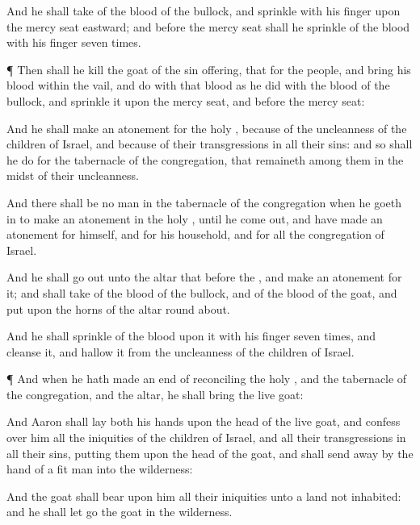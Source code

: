{And he shall
take of the
blood of the
bullock, and
sprinkle
{} with his
finger upon the mercy
seat
eastward; and
before the mercy
seat shall he
sprinkle of the
blood with his
finger
seven
times.


\par }{\PP {}¶ Then shall he
kill the
goat of the sin
offering, that
{} for the
people, and
bring his
blood
within the
vail, and
do with that
blood as he
did with the
blood of the
bullock, and
sprinkle it upon the mercy
seat, and
before the mercy
seat:

And he shall make an
atonement for the
holy
{}, because of the
uncleanness of the
children of
Israel, and because of their
transgressions in all their
sins: and so shall he
do for the
tabernacle of the
congregation, that
remaineth among them in the
midst of their
uncleanness.

And there shall be no
man in the
tabernacle of the
congregation when he
goeth in to make an
atonement in the
holy
{}, until he come
out, and have made an
atonement for himself, and for his
household, and for all the
congregation of
Israel.

And he shall go
out unto the
altar that
{}
before the
{}, and make an
atonement for it; and shall
take of the
blood of the
bullock, and of the
blood of the
goat, and
put
{} upon the
horns of the
altar round
about.

And he shall
sprinkle of the
blood upon it with his
finger
seven
times, and
cleanse it, and
hallow it from the
uncleanness of the
children of
Israel.


\par }{\PP {}¶ And when he hath made an
end of
reconciling the
holy
{}, and the
tabernacle of the
congregation, and the
altar, he shall
bring the
live
goat:

And
Aaron shall
lay
both his
hands upon the
head of the
live
goat, and
confess over him all the
iniquities of the
children of
Israel, and all their
transgressions in all their
sins,
putting them upon the
head of the
goat, and shall send
{}
away by the
hand of a
fit
man into the
wilderness:

And the
goat shall
bear upon him all their
iniquities unto a
land not
inhabited: and he shall let
go the
goat in the
wilderness.

}

